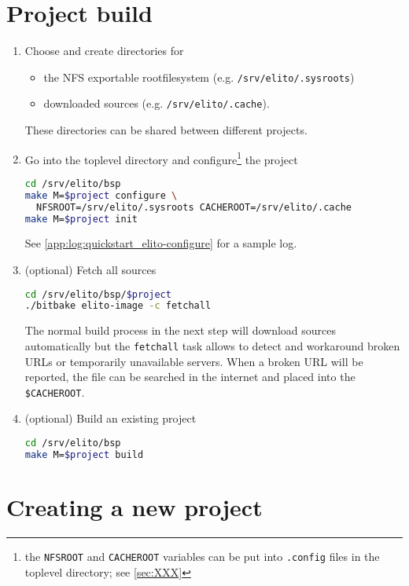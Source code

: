 \section{Project build}
\label{subsec:quickstart_project-build}

\begin{enumerate}[resume]
\item Choose and create directories for
  \begin{itemize}
  \item the NFS exportable rootfilesystem (e.g. \texttt{/srv/elito/.sysroots})
  \item downloaded sources (e.g. \texttt{/srv/elito/.cache}).
  \end{itemize}

  These directories can be shared between different projects.

\item Go into the toplevel directory and configure\footnote{the
    \texttt{NFSROOT} and \texttt{CACHEROOT} variables can be put into
    \texttt{.config} files in the toplevel directory; see
    \autoref{sec:XXX}} the project %
\begin{lstlisting}[language=bash]
cd /srv/elito/bsp
make M=$project configure \
  NFSROOT=/srv/elito/.sysroots CACHEROOT=/srv/elito/.cache
make M=$project init
\end{lstlisting}

  See \autoref{app:log:quickstart_elito-configure} for a sample log.

\item (optional) Fetch all sources
\begin{lstlisting}[language=bash]
cd /srv/elito/bsp/$project
./bitbake elito-image -c fetchall
\end{lstlisting}%

  The normal build process in the next step will download sources
  automatically but the \texttt{fetchall} task allows to detect and
  workaround broken URLs or temporarily unavailable servers.  When a
  broken URL will be reported, the file can be searched in the
  internet and placed into the \texttt{\$CACHEROOT}.
\item (optional) Build an existing project
\begin{lstlisting}[language=bash]
cd /srv/elito/bsp
make M=$project build
\end{lstlisting}%

\end{enumerate}

\section{Creating a new project}
\label{sec:quickstart_new-project}

